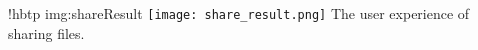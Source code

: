 \namedfigure
{!hbtp}
{img:shareResult}
{\texttt{[image: share\_result.png]}}
{The user experience of sharing files.}
